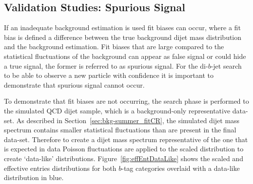 
\FloatBarrier
\subsection{Validation Studies: Spurious Signal}
\label{sec:bkg-summer_spusig}

If an inadequate background estimation is used fit biases can occur,
where a fit bias is defined a difference between the true background
dijet mass distribution and the background estimation.
Fit biases that are large compared to the statistical fluctuations of the background
can appear as false signal or could hide a true signal, the former is referred to as spurious signal.
For the di-$b$-jet search to be able to observe a new particle with confidence it is
important to demonstrate that spurious signal cannot occur.

To demonstrate that fit biases are not occurring,
the search phase is performed to the simulated QCD dijet sample,
which is a background-only representative data-set. 
As described in Section~\ref{sec:bkg-summer_fitCR},
the simulated dijet mass spectrum contains smaller statistical fluctuations than are present in the final data-set.
Therefore to create a dijet mass spectrum representative of the one that is expected in data 
Poisson fluctuations are applied to the scaled distribution to create `data-like' distributions.
Figure~\ref{fig:effEntDataLike} shows the scaled and effective entries distributions for both
$b$-tag categories overlaid with a data-like distribution in blue.

